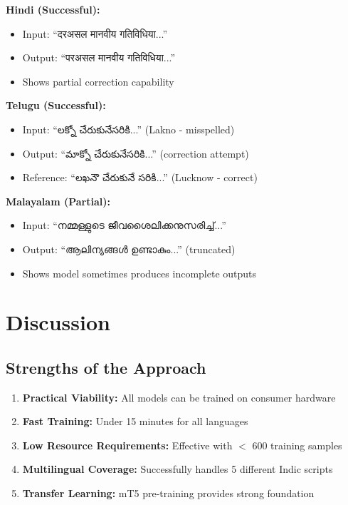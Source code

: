 \documentclass[12pt,a4paper]{article}
\begin{document}
\textbf{Hindi (Successful):}
\begin{itemize}
    \item Input: ``दरअसल मानवीय गतिविधिया...''
    \item Output: ``परअसल मानवीय गतिविधिया...''
    \item Shows partial correction capability
\end{itemize}

\textbf{Telugu (Successful):}
\begin{itemize}
    \item Input: ``లక్నో చేరుకునేసరికి...'' (Lakno - misspelled)
    \item Output: ``మాక్నో చేరుకునేసరికి...'' (correction attempt)
    \item Reference: ``లఖనౌ చేరుకునే సరికి...'' (Lucknow - correct)
\end{itemize}

\textbf{Malayalam (Partial):}
\begin{itemize}
    \item Input: ``നമ്മള്ളുടെ ജീവശൈലിക്കനുസരിച്ച്...''
    \item Output: ``ആലിന്യങ്ങൾ ഉണ്ടാകും...'' (truncated)
    \item Shows model sometimes produces incomplete outputs
\end{itemize}

\newpage

\section{Discussion}

\subsection{Strengths of the Approach}
\begin{enumerate}
    \item \textbf{Practical Viability:} All models can be trained on consumer hardware
    \item \textbf{Fast Training:} Under 15 minutes for all languages
    \item \textbf{Low Resource Requirements:} Effective with $<$ 600 training samples
    \item \textbf{Multilingual Coverage:} Successfully handles 5 different Indic scripts
    \item \textbf{Transfer Learning:} mT5 pre-training provides strong foundation
\end{enumerate}
\end{document}
